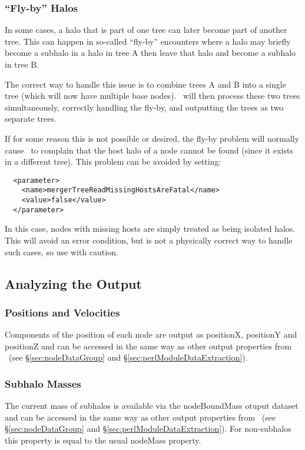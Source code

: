 \subsubsection{``Fly-by'' Halos}

In some cases, a halo that is part of one tree can later become part of another tree. This can happen in so-called ``fly-by'' encounters where a halo may briefly become a subhalo in a halo in tree A then leave that halo and become a subhalo in tree B.

The correct way to handle this issue is to combine trees A and B into a single tree (which will now have multiple base nodes). \glc\ will then process these two trees simultaneously, correctly handling the fly-by, and outputting the trees as two separate trees.

If for some reason this is not possible or desired, the fly-by problem will normally cause \glc\ to complain that the host halo of a node cannot be found (since it exists in a different tree). This problem can be avoided by setting:
\begin{verbatim}
  <parameter>
    <name>mergerTreeReadMissingHostsAreFatal</name>
    <value>false</value>
  </parameter>
\end{verbatim}
In this case, nodes with missing hosts are simply treated as being isolated halos. This will avoid an error condition, but is not a physically correct way to handle such cases, so use with caution.

\subsection{Analyzing the Output}

\subsubsection{Positions and Velocities}

Components of the position of each node are output as {\normalfont \ttfamily positionX}, {\normalfont \ttfamily positionY} and {\normalfont \ttfamily positionZ} and can be accessed in the same way as other output properties from \glc\ (see \S\ref{sec:nodeDataGroup} and \S\ref{sec:perlModuleDataExtraction}).

\subsubsection{Subhalo Masses}

The current mass of subhalos is available via the {\normalfont \ttfamily nodeBoundMass} otuput dataset and can be accessed in the same way as other output properties from \glc\ (see \S\ref{sec:nodeDataGroup} and \S\ref{sec:perlModuleDataExtraction}). For non-subhalos this property is equal to the usual {\normalfont \ttfamily nodeMass} property.

